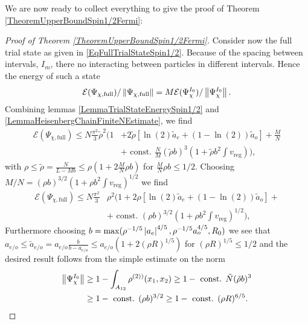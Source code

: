 We are now ready to collect everything to give the proof of Theorem \ref{TheoremUpperBoundSpin1/2Fermi}:
\begin{proof}[Proof of Theorem \ref{TheoremUpperBoundSpin1/2Fermi}]
	Consider now the full trial state as given in \eqref{EqFullTrialStateSpin1/2}. Because of the spacing between intervals, $ I_m $, there no interacting between particles in different intervals. Hence the energy of such a state \begin{equation}\label{key}
	\mathcal{E}(\Psi_{\chi,\text{full}})/\left\lVert \Psi_{\chi,\text{full}} \right\rVert=M\mathcal{E}(\Psi_{\chi}^{I_0})/\left\lVert \Psi^{I_0}_{\chi} \right\rVert.
	\end{equation}
	Combining lemmas \ref{LemmaTrialStateEnergySpin1/2} and \ref{LemmaHeisenbergChainFiniteNEstimate}, we find \begin{equation}
	\begin{aligned}
	\mathcal{E}(\Psi_{\chi,\text{full}})\leq N\frac{\pi^2}{3}\tilde{\rho}^2\Bigg(1&+2\tilde{\rho}\left[\ln(2)\tilde{a}_e+(1-\ln(2))\tilde{a}_o\right]+\frac{M}{N}\\&+\text{ const. }\frac{N}{M}(\tilde{\rho} b)^3 \left(1+\tilde{\rho} b^2\int v_{\text{reg}}\right)\Bigg),
	\end{aligned}
	\end{equation}
	with $ \rho\leq \tilde{\rho}=\frac{N}{L-Mb}\leq\rho\left(1+2\frac{M}{N}\rho b\right) $ for $ \frac{M}{N}\rho b\leq 1/2 $. Choosing $ M/N=(\rho b)^{3/2}\left(1+\rho b^2\int v_{\text{reg}}\right)^{1/2} $ we find \begin{equation}
	\begin{aligned}
	\mathcal{E}(\Psi_{\chi,\text{full}})\leq N\frac{\pi^2}{3}&\rho^2\Bigg(1+2\rho\left[\ln(2)\tilde{a}_e+(1-\ln(2))\tilde{a}_o\right]+\\&+\text{ const. }(\rho b)^{3/2} \left(1+\rho b^2\int v_{\text{reg}}\right)^{1/2}\Bigg),
	\end{aligned}
	\end{equation}
	Furthermore choosing $ b=\max(\rho^{-1/5}\left\lvert a_e \right\rvert^{4/5},\rho^{-1/5}a_o^{4/5},R_0) $ we see that $ a_{e/o}\leq \tilde{a}_{e/o}=a_{e/o}\frac{b}{b-a_{e/o}}\leq a_{e/o}\left(1+2(\rho R)^{1/5}\right) $ for $ (\rho R)^{1/5}\leq 1/2 $ and the desired result follows from the simple estimate on the norm\begin{equation}
	\begin{aligned}
	\left\lVert \Psi^{I_0}_{\chi} \right\rVert&\geq 1-\int_{A_{12}} \rho^{(2))}(x_1,x_2)\geq 1-\text{ const. }\tilde{N}(\tilde{\rho}b)^3\\&\geq 1-\text{ const. }(\rho b)^{3/2}\geq 1-\text{ const. }(\rho R)^{6/5}.
	\end{aligned}
	\end{equation}
\end{proof}



